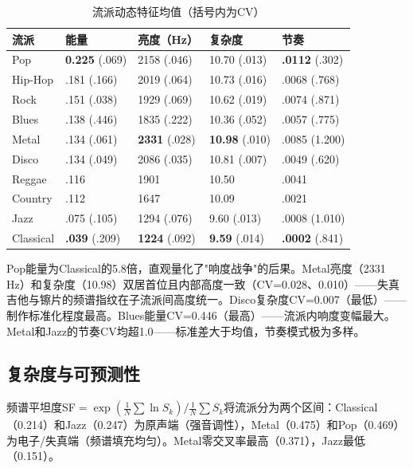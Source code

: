 \documentclass[12pt,a4paper]{article}
\begin{document}
\begin{table}[htbp]
    \centering
    \caption{流派动态特征均值（括号内为CV）}
    \label{tab:genre_dyn}
    \small
    \begin{tabularx}{\textwidth}{lXXXX}
        \toprule
        \textbf{流派} & \textbf{能量} & \textbf{亮度（Hz）} & \textbf{复杂度} & \textbf{节奏} \\
        \midrule
        Pop & \textbf{0.225} (.069) & 2158 (.046) & 10.70 (.013) & \textbf{.0112} (.302) \\
        Hip-Hop & .181 (.166) & 2019 (.064) & 10.73 (.016) & .0068 (.768) \\
        Rock & .151 (.038) & 1929 (.069) & 10.62 (.019) & .0074 (.871) \\
        Blues & .138 (.446) & 1835 (.222) & 10.36 (.052) & .0057 (.775) \\
        Metal & .134 (.061) & \textbf{2331} (.028) & \textbf{10.98} (.010) & .0085 (1.200) \\
        Disco & .134 (.049) & 2086 (.035) & 10.81 (.007) & .0049 (.620) \\
        Reggae & .116 & 1901 & 10.50 & .0041 \\
        Country & .112 & 1647 & 10.09 & .0021 \\
        Jazz & .075 (.105) & 1294 (.076) & 9.60 (.013) & .0008 (1.010) \\
        Classical & \textbf{.039} (.209) & \textbf{1224} (.092) & \textbf{9.59} (.014) & \textbf{.0002} (.841) \\
        \bottomrule
    \end{tabularx}
\end{table}

Pop能量为Classical的5.8倍，直观量化了"响度战争"的后果。Metal亮度（2331 Hz）和复杂度（10.98）双居首位且内部高度一致（CV=0.028、0.010）——失真吉他与镲片的频谱指纹在子流派间高度统一。Disco复杂度CV=0.007（最低）——制作标准化程度最高。Blues能量CV=0.446（最高）——流派内响度变幅最大。Metal和Jazz的节奏CV均超1.0——标准差大于均值，节奏模式极为多样。

\subsection{复杂度与可预测性}

频谱平坦度SF$=\exp(\frac{1}{N}\sum\ln S_k)/\frac{1}{N}\sum S_k$将流派分为两个区间：Classical（0.214）和Jazz（0.247）为原声端（强音调性），Metal（0.475）和Pop（0.469）为电子/失真端（频谱填充均匀）。Metal零交叉率最高（0.371），Jazz最低（0.151）。
\end{document}
